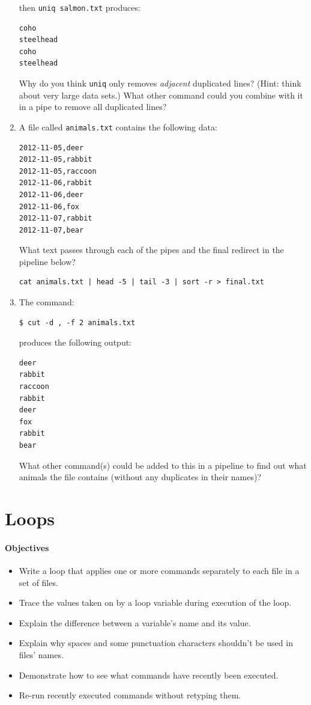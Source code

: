 \documentclass[]{book}
\begin{document}
\begin{enumerate}
  then \texttt{uniq salmon.txt} produces:

\begin{verbatim}
coho
steelhead
coho
steelhead
\end{verbatim}

  Why do you think \texttt{uniq} only removes \emph{adjacent} duplicated
  lines? (Hint: think about very large data sets.) What other command
  could you combine with it in a pipe to remove all duplicated lines?
\item
  A file called \texttt{animals.txt} contains the following data:

\begin{verbatim}
2012-11-05,deer
2012-11-05,rabbit
2012-11-05,raccoon
2012-11-06,rabbit
2012-11-06,deer
2012-11-06,fox
2012-11-07,rabbit
2012-11-07,bear
\end{verbatim}

  What text passes through each of the pipes and the final redirect in
  the pipeline below?

\begin{verbatim}
cat animals.txt | head -5 | tail -3 | sort -r > final.txt
\end{verbatim}
\item
  The command:

\begin{verbatim}
$ cut -d , -f 2 animals.txt
\end{verbatim}

  produces the following output:

\begin{verbatim}
deer
rabbit
raccoon
rabbit
deer
fox
rabbit
bear
\end{verbatim}

  What other command(s) could be added to this in a pipeline to find out
  what animals the file contains (without any duplicates in their
  names)?
\end{enumerate}

\section{Loops}

\mbox{}\paragraph{Objectives}

\begin{itemize}
\item
  Write a loop that applies one or more commands separately to each file
  in a set of files.
\item
  Trace the values taken on by a loop variable during execution of the
  loop.
\item
  Explain the difference between a variable's name and its value.
\item
  Explain why spaces and some punctuation characters shouldn't be used
  in files' names.
\item
  Demonstrate how to see what commands have recently been executed.
\item
  Re-run recently executed commands without retyping them.
\end{itemize}
\end{document}
